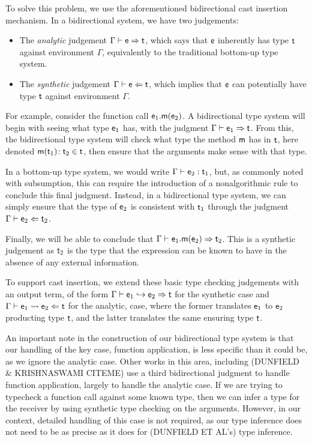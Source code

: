 \documentclass[preprint]{sigplanconf}
\newcommand{\m}{\M{\xt{m}}}
\newcommand{\e}{\M{\xt{e}}}
\renewcommand{\t}{\M{\xt{t}}}
\newcommand{\tp}[1]{\M{ \t_{#1} }}
\newcommand{\ep}[1]{\M{ \e_{#1} }}
\newcommand{\Call}[3]{\M{#1.#2(#3)}}
\newcommand{\HT}[2]{\M{{#1}\!:{#2}}}
\newcommand{\Mtype}[3]{\M{ \HT { #1( #2 )}{#3}}}
\newcommand{\M}[1]{\ensuremath{#1}\xspace}
\newcommand{\xt}[1]{{\sf{#1}}\xspace}
\newcommand{\E}{\M{\Gamma}}
\newcommand{\GenCast}[4]{#1 \vdash #2 \hookrightarrow #3 \Rightarrow #4}
\newcommand{\AnaCast}[4]{#1 \vdash #2 \rightsquigarrow #3 \Leftarrow #4}
\begin{document}
To solve this problem, we use the aforementioned bidirectional cast insertion
mechanism. In a bidirectional system, we have two judgements:

\begin{itemize}
\item The \emph{analytic} judgement $\E \vdash \e \Rightarrow \t$, which says that
$\e$ inherently has type $\t$ against environment $\E$, equivalently to the
traditional bottom-up type system.
\item The \emph{synthetic} judgement $\E \vdash \e \Leftarrow \t$, which implies that
$\e$ can potentially have type $\t$ against environment $\E$.
\end{itemize}

For example, consider the function call $\Call{\ep1}{\m}{\ep2}$. A bidirectional
type system will begin with seeing what type $\ep1$ has, with the judgment $\E \vdash \ep1 \Rightarrow \t$.
From this, the bidirectional type system will check what type the method $\m$ has in $\t$,
 here denoted $\Mtype\m{\tp1}{\tp2} \in \t$, then ensure that the arguments make sense with that type.

In a bottom-up type system, we would write $\E \vdash \ep2 : \tp1$, but, as commonly noted with subsumption,
this can require the introduction of a nonalgorithmic rule to conclude this final judgment. Instead, in a 
bidirectional type system, we can simply ensure that the type of $\ep2$ is consistent with $\tp1$ through the
judgment $\E \vdash \ep2 \Leftarrow \tp2$.

Finally, we will be able to conclude that $\E \vdash \Call{\ep1}{\m}{\ep2} \Rightarrow \tp2$. This is a
synthetic judgement as $\tp2$ is the type that the expression can be known to have in the absence of any
external information.

To support cast insertion, we extend these basic type checking judgements with an output term, of the form 
$\GenCast{\E}{\ep1}{\ep2}{\t}$ for the synthetic case and $\AnaCast{\E}{\ep1}{\ep2}{\t}$ for the analytic,
case, where the former translates $\ep1$ to $\ep2$ producting type $\t$, and the latter translates the same
ensuring type $\t$.

An important note in the construction of our bidirectional type system is that our handling of the key case,
function application, is less specific than it could be, as we ignore the analytic case. Other works in this 
area, including (DUNFIELD \& KRISHNASWAMI CITEME) use a third bidirectional judgment to handle function 
application, largely to handle the analytic case. If we are trying to typecheck a function call against some 
known type, then we can infer a type for the receiver by using synthetic type checking on the arguments. 
However, in our context, detailed handling of this case is not required, as our type inference does not 
need to be as precise as it does for (DUNFIELD ET AL's) type inference.
\end{document}
